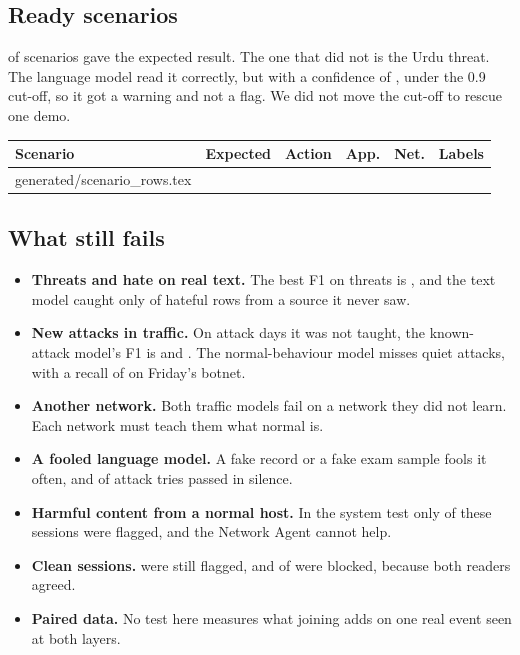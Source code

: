 \documentclass[11pt,a4paper]{article}
\makeatletter
\newcommand{\need}[1][10]{\Needspace{#1\baselineskip}}
\newcommand{\tablerows}[1]{\@@input #1 }
\makeatother
\begin{document}
\need[16]
\subsection*{Ready scenarios}

\scenariosPassed{} of \scenariosTotal{} scenarios gave the expected result. The one that did not is the Urdu threat. The language model read it correctly, but with a confidence of \urduConfidence{}, under the 0.9 cut-off, so it got a warning and not a flag. We did not move the cut-off to rescue one demo.

\begin{center}
\small
\begin{tabular}{@{}lllrrl@{}}
\toprule
\textbf{Scenario} & \textbf{Expected} & \textbf{Action} & \textbf{App.} & \textbf{Net.} & \textbf{Labels} \\
\midrule
\tablerows{generated/scenario_rows.tex}
\bottomrule
\end{tabular}
\end{center}

\subsection*{What still fails}

\begin{itemize}
  \item \textbf{Threats and hate on real text.} The best F1 on threats is \textThreatFone{}, and the text model caught only \hateUnseenRecall{} of hateful rows from a source it never saw.
  \item \textbf{New attacks in traffic.} On attack days it was not taught, the known-attack model's F1 is \thursdayFone{} and \fridayFone{}. The normal-behaviour model misses quiet attacks, with a recall of \botnetRecall{} on Friday's botnet.
  \item \textbf{Another network.} Both traffic models fail on a network they did not learn. Each network must teach them what normal is.
  \item \textbf{A fooled language model.} A fake record or a fake exam sample fools it often, and \injectionSilent{} of \injectionTried{} attack tries passed in silence.
  \item \textbf{Harmful content from a normal host.} In the system test only \systemHarmful{} of these sessions were flagged, and the Network Agent cannot help.
  \item \textbf{Clean sessions.} \systemCleanFA{} were still flagged, and \systemCleanBlocked{} of \systemGroup{} were blocked, because both readers agreed.
  \item \textbf{Paired data.} No test here measures what joining adds on one real event seen at both layers.
\end{itemize}
\end{document}
